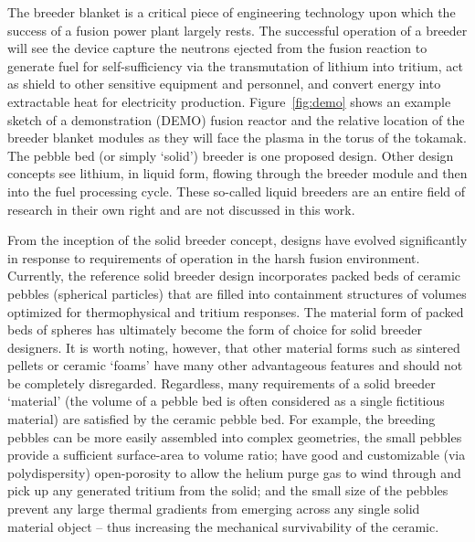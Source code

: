 The breeder blanket is a critical piece of engineering technology upon which the success of a fusion power plant largely rests. The successful operation of a breeder will see the device capture the neutrons ejected from the fusion reaction to generate fuel for self-sufficiency via the transmutation of lithium into tritium, act as shield to other sensitive equipment and personnel, and convert energy into extractable heat for electricity production. Figure~\ref{fig:demo} shows an example sketch of a demonstration (DEMO) fusion reactor and the relative location of the breeder blanket modules as they will face the plasma in the torus of the tokamak. The pebble bed (or simply `solid') breeder is one proposed design. Other design concepts see lithium, in liquid form, flowing through the breeder module and then into the fuel processing cycle. These so-called liquid breeders are an entire field of research in their own right and are not discussed in this work.

From the inception of the solid breeder concept, designs have evolved significantly in response to requirements of operation in the harsh fusion environment. Currently, the reference solid breeder design incorporates packed beds of ceramic pebbles (spherical particles) that are filled into containment structures of volumes optimized for thermophysical and tritium responses. The material form of packed beds of spheres has ultimately become the form of choice for solid breeder designers. It is worth noting, however, that other material forms such as sintered pellets or ceramic `foams' have many other advantageous features and should not be completely disregarded. Regardless, many requirements of a solid breeder `material' (the volume of a pebble bed is often considered as a single fictitious material) are satisfied by the ceramic pebble bed. For example, the breeding pebbles can be more easily assembled into complex geometries, the small pebbles provide a sufficient surface-area to volume ratio; have good and customizable (via polydispersity) open-porosity to allow the helium purge gas to wind through and pick up any generated tritium from the solid; and the small size of the pebbles prevent any large thermal gradients from emerging across any single solid material object -- thus increasing the mechanical survivability of the ceramic.

